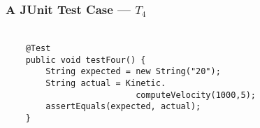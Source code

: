 
\begin{frame}[fragile]
  \frametitle{\vspace*{.5in}A JUnit Test Case --- $T_4$}
  \framesubtitle{}

  \normalsize
  \hspace*{-.65in}
  \begin{minipage}{5in}
    \Large
    \vspace*{-.1in}
    \begin{verbatim}

    @Test
    public void testFour() {
        String expected = new String("20");
        String actual = Kinetic.
                          computeVelocity(1000,5);
        assertEquals(expected, actual);
    }

    \end{verbatim}
  \vspace*{.05in}
  \end{minipage}
  \normalsize
  \HUGE



\end{frame}
